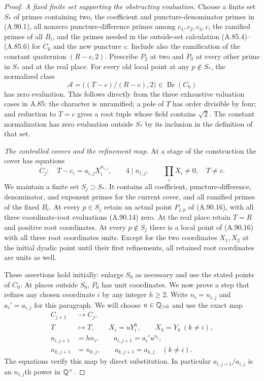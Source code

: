 \begin{proof}
\emph{A fixed finite set supporting the obstructing evaluation.}
Choose a finite set $S_*$ of primes containing two,
the coefficient and puncture-denominator primes in
(A.90.1), all nonzero puncture-difference primes
among $c_1,c_2,c_3,c$, the ramified primes of all
$B_i$, and the primes needed in the outside-set
calculation (A.85.4)--(A.85.6) for $C_0$ and the
new puncture $c$.
Include also the ramification of the constant
quaternion $(R-c,2)$.
Prescribe $P_2$ at two and $P_0$ at every other
prime in $S_*$ and at the real place.
For every old local point at any $p\notin S_*$,
the normalized class
\[
             \mathcal A=\bigl((T-c)/(R-c),2\bigr)
                                  \in\operatorname{Br}(C_0)
 \tag{A.90.15}
\]
has zero evaluation.
This follows directly from the three exhaustive
valuation cases in A.85: the character is unramified;
a pole of $T$ has order divisible by four; and
reduction to $T=c$ gives a root tuple whose field
contains $\sqrt2$.  The constant normalization
has zero evaluation outside $S_*$ by its inclusion
in the definition of that set.

\emph{The controlled covers and the refinement map.}
At a stage of the construction the cover has equations
\[
 C_j:\quad T-c_i=a_{i,j}X_i^{n_{i,j}},\qquad
          4\mid n_{i,j},\qquad \prod_iX_i\ne0,\quad T\ne c.
 \tag{A.90.16}
\]
We maintain a finite set $S_j\supset S_*$.
It contains all coefficient, puncture-difference,
denominator, and exponent primes for the current
cover, and all ramified primes of the fixed $B_i$.
At every $p\in S_j$ retain an actual point $P_{j,p}$
of (A.90.16), with all three coordinate-root
evaluations (A.90.14) zero.
At the real place retain $T=R$ and positive root
coordinates.
At every $p\notin S_j$ there is a local point of
(A.90.16) with all three root coordinates units.
Except for the two coordinates $X_1,X_2$ at the
initial dyadic point until their first refinements,
all retained root coordinates are units as well.

These assertions hold initially: enlarge $S_0$
as necessary and use the stated points of $C_0$.
At places outside $S_0$, $P_0$ has unit coordinates.
We now prove a step that refines any chosen
coordinate $i$ by any integer $h\ge2$.
Write $n_i=n_{i,j}$ and $a_i'=a_{i,j}$ for this
paragraph.  We will choose $u\in\mathbb Q_{>0}$ and use
the exact map
\[
 \begin{split}
 C_{j+1}&\longrightarrow C_j,\\
 T&\longmapsto T,\qquad
 X_i=uY_i^h,\qquad X_k=Y_k\ (k\ne i),\\
 n_{i,j+1}&=hn_i,\qquad
 a_{i,j+1}=a_i'u^{n_i},\\
 n_{k,j+1}&=n_{k,j},\qquad
 a_{k,j+1}=a_{k,j}\quad(k\ne i).
 \end{split}
 \tag{A.90.17}
\]
The equations verify this map by direct substitution.
In particular $a_{i,j+1}/a_{i,j}$ is an
$n_{i,j}$th power in $\mathbb Q^\times$.


\end{proof}

